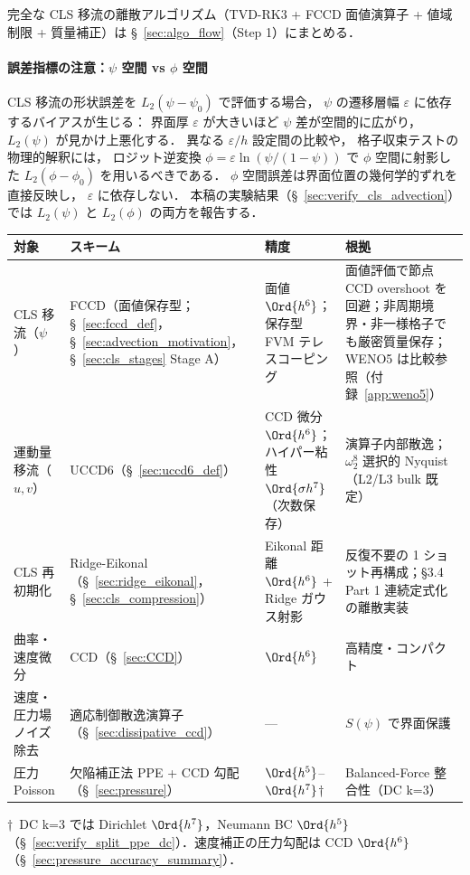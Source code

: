 \label{alg:dccd_adv}%
完全な CLS 移流の離散アルゴリズム（TVD-RK3 + FCCD 面値演算子 + 値域制限 + 質量補正）は
§~\ref{sec:algo_flow}（Step 1）にまとめる．

\paragraph{誤差指標の注意：$\psi$ 空間 vs $\phi$ 空間}
CLS 移流の形状誤差を $L_2(\psi - \psi_0)$ で評価する場合，
$\psi$ の遷移層幅 $\varepsilon$ に依存するバイアスが生じる：
界面厚 $\varepsilon$ が大きいほど $\psi$ 差が空間的に広がり，
$L_2(\psi)$ が見かけ上悪化する．
異なる $\varepsilon/h$ 設定間の比較や，
格子収束テストの物理的解釈には，
ロジット逆変換 $\phi = \varepsilon\ln(\psi/(1-\psi))$
で $\phi$ 空間に射影した $L_2(\phi - \phi_0)$ を用いるべきである．
$\phi$ 空間誤差は界面位置の幾何学的ずれを直接反映し，
$\varepsilon$ に依存しない．
本稿の実験結果（§~\ref{sec:verify_cls_advection}）では
$L_2(\psi)$ と $L_2(\phi)$ の両方を報告する．

\begin{tcolorbox}[mybox, title={本稿の空間離散化スキームの役割分担}]
\label{box:scheme_roles}
\begin{center}
\renewcommand{\arraystretch}{1.3}
\begin{tabular}{>{\raggedright\arraybackslash}p{2.5cm}>{\raggedright\arraybackslash}p{3.8cm}>{\raggedright\arraybackslash}p{1.5cm}>{\raggedright\arraybackslash}p{4cm}}
\hline
対象 & スキーム & 精度 & 根拠 \\
\hline
CLS 移流（$\psi$） & FCCD（面値保存型；§~\ref{sec:fccd_def}，§~\ref{sec:advection_motivation}，§~\ref{sec:cls_stages} Stage A） & 面値 $\Ord{h^6}$；保存型 FVM テレスコーピング & 面値評価で節点 CCD overshoot を回避；非周期境界・非一様格子でも厳密質量保存；WENO5 は比較参照（付録~\ref{app:weno5}） \\
運動量移流（$u,v$） & UCCD6（§~\ref{sec:uccd6_def}） & CCD 微分 $\Ord{h^6}$；ハイパー粘性 $\Ord{\sigma h^7}$（次数保存） & 演算子内部散逸；$\omega_2^8$ 選択的 Nyquist（L2/L3 bulk 既定） \\
CLS 再初期化 & Ridge-Eikonal（§~\ref{sec:ridge_eikonal}，§~\ref{sec:cls_compression}） & Eikonal 距離 $\Ord{h^6}$ + Ridge ガウス射影 & 反復不要の 1 ショット再構成；§3.4 Part 1 連続定式化の離散実装 \\
曲率・速度微分 & CCD（§~\ref{sec:CCD}） & $\Ord{h^6}$ & 高精度・コンパクト \\
速度・圧力場ノイズ除去 & 適応制御散逸演算子（§~\ref{sec:dissipative_ccd}） & — & $S(\psi)$ で界面保護 \\
圧力 Poisson & 欠陥補正法 PPE + CCD 勾配（§~\ref{sec:pressure}） & $\Ord{h^5}$--$\Ord{h^7}$† & Balanced-Force 整合性（DC k=3） \\
\hline
\end{tabular}
\end{center}
{\small †\ DC k=3 では Dirichlet $\Ord{h^7}$，Neumann BC $\Ord{h^5}$（§~\ref{sec:verify_split_ppe_dc}）．速度補正の圧力勾配は CCD $\Ord{h^6}$（§~\ref{sec:pressure_accuracy_summary}）．}
\end{tcolorbox}
